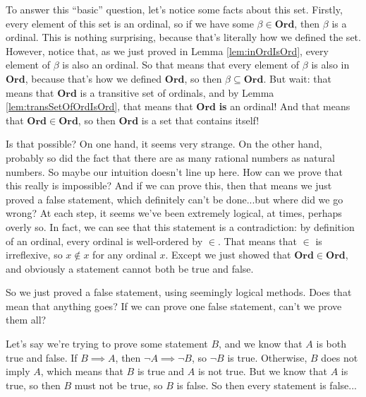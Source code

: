 To answer this ``basic'' question, let's notice some facts about this set.
Firstly, every element of this set is an ordinal, so if we have some $\beta \in \bm{Ord}$, then $\beta$ is a ordinal.
This is nothing surprising, because that's literally how we defined the set.
However, notice that, as we just proved in Lemma \ref{lem:inOrdIsOrd}, every element of $\beta$ is also an ordinal.
So that means that every element of $\beta$ is also in $\bm{Ord}$, because that's how we defined $\bm{Ord}$, so then $\beta \subseteq \bm{Ord}$.
But wait: that means that $\bm{Ord}$ is a transitive set of ordinals, and by Lemma \ref{lem:transSetOfOrdIsOrd}, that means that $\bm{Ord}$ \textbf{is} an ordinal!
And that means that $\bm{Ord} \in \bm{Ord}$, so then $\bm{Ord}$ is a set that contains itself!

Is that possible?
On one hand, it seems very strange.
On the other hand, probably so did the fact that there are as many rational numbers as natural numbers.
So maybe our intuition doesn't line up here.
How can we prove that this really is impossible?
And if we can prove this, then that means we just proved a false statement, which definitely can't be done...but where did we go wrong?
At each step, it seems we've been extremely logical, at times, perhaps overly so.
In fact, we can see that this statement is a contradiction: by definition of an ordinal, every ordinal is well-ordered by $\in$.
That means that $\in$ is irreflexive, so $x \not\in x$ for any ordinal $x$.
Except we just showed that $\bm{Ord} \in \bm{Ord}$, and obviously a statement cannot both be true and false. 

So we just proved a false statement, using seemingly logical methods.
Does that mean that anything goes?
If we can prove one false statement, can't we prove them all? 

Let's say we're trying to prove some statement $B$, and we know that $A$ is both true and false.
If $B \implies A$, then $\neg A \implies \neg B$, so $\neg B$ is true.
Otherwise, $B$ does not imply $A$, which means that $B$ is true and $A$ is not true.
But we know that $A$ is true, so then $B$ must not be true, so $B$ is false.
So then every statement is false... 

